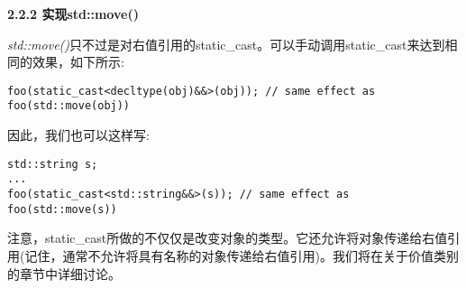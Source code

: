 \hspace*{\fill} \par %
\textbf{2.2.2 实现std::move()}

\textit{std::move()}只不过是对右值引用的static\_cast。可以手动调用static\_cast来达到相同的效果，如下所示:\par

\begin{lstlisting}[caption={}]
foo(static_cast<decltype(obj)&&>(obj)); // same effect as foo(std::move(obj))
\end{lstlisting}

因此，我们也可以这样写:\par

\begin{lstlisting}[caption={}]
std::string s;
...
foo(static_cast<std::string&&>(s)); // same effect as foo(std::move(s))
\end{lstlisting}

注意，static\_cast所做的不仅仅是改变对象的类型。它还允许将对象传递给右值引用(记住，通常不允许将具有名称的对象传递给右值引用)。我们将在关于价值类别的章节中详细讨论。\par





























